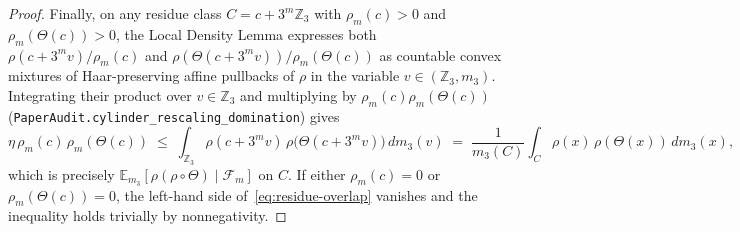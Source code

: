 \documentclass[11pt,a4paper]{article}
\numberwithin{equation}{section}
\theoremstyle{definition}
\theoremstyle{remark}
\newcommand{\Z}{\mathbb{Z}}
\newcommand{\E}{\mathbb{E}}
\newcommand{\cF}{\mathcal{F}}
\begin{document}
\begin{proof}
Finally, on any residue class $C = c + 3^m\Z_3$ with $\rho_m(c) > 0$ and $\rho_m(\Theta(c)) > 0$, the Local Density Lemma expresses both $\rho(c + 3^m v)/\rho_m(c)$ and $\rho(\Theta(c + 3^m v))/\rho_m(\Theta(c))$ as countable convex mixtures of Haar-preserving affine pullbacks of $\rho$ in the variable $v \in (\Z_3, m_3)$. Integrating their product over $v \in \Z_3$ and multiplying by $\rho_m(c)\rho_m(\Theta(c))$ (\texttt{PaperAudit.cylinder\_rescaling\_domination}) gives
\[
 \eta\,\rho_m(c)\,\rho_m(\Theta(c)) \;\le\; \int_{\Z_3} \rho(c + 3^m v)\,\rho\bigl(\Theta(c + 3^m v)\bigr)\,dm_3(v) \;=\; \frac{1}{m_3(C)}\int_C \rho(x)\,\rho(\Theta(x))\,dm_3(x),
\]
which is precisely $\E_{m_3}[\rho(\rho \circ \Theta) \mid \cF_m]$ on $C$. If either $\rho_m(c) = 0$ or $\rho_m(\Theta(c)) = 0$, the left-hand side of~\eqref{eq:residue-overlap} vanishes and the inequality holds trivially by nonnegativity.
\end{proof}
\end{document}
